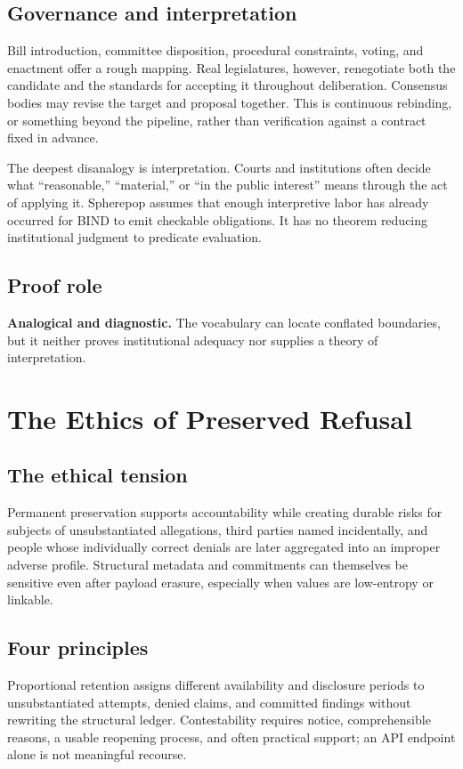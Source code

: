 \documentclass[11pt,openany]{book}
\begin{document}
\section{Governance and interpretation}
Bill introduction, committee disposition, procedural constraints, voting, and
enactment offer a rough mapping. Real legislatures, however, renegotiate both
the candidate and the standards for accepting it throughout deliberation.
Consensus bodies may revise the target and proposal together. This is
continuous rebinding, or something beyond the pipeline, rather than verification
against a contract fixed in advance.

The deepest disanalogy is interpretation. Courts and institutions often decide
what “reasonable,” “material,” or “in the public interest” means through the
act of applying it. Spherepop assumes that enough interpretive labor has
already occurred for BIND to emit checkable obligations. It has no theorem
reducing institutional judgment to predicate evaluation.

\section{Proof role}
\textbf{Analogical and diagnostic.} The vocabulary can locate conflated
boundaries, but it neither proves institutional adequacy nor supplies a theory
of interpretation.

\chapter{The Ethics of Preserved Refusal}
\section{The ethical tension}
Permanent preservation supports accountability while creating durable risks
for subjects of unsubstantiated allegations, third parties named incidentally,
and people whose individually correct denials are later aggregated into an
improper adverse profile. Structural metadata and commitments can themselves
be sensitive even after payload erasure, especially when values are
low-entropy or linkable.

\section{Four principles}
Proportional retention assigns different availability and disclosure periods
to unsubstantiated attempts, denied claims, and committed findings without
rewriting the structural ledger. Contestability requires notice,
comprehensible reasons, a usable reopening process, and often practical support;
an API endpoint alone is not meaningful recourse.
\end{document}
